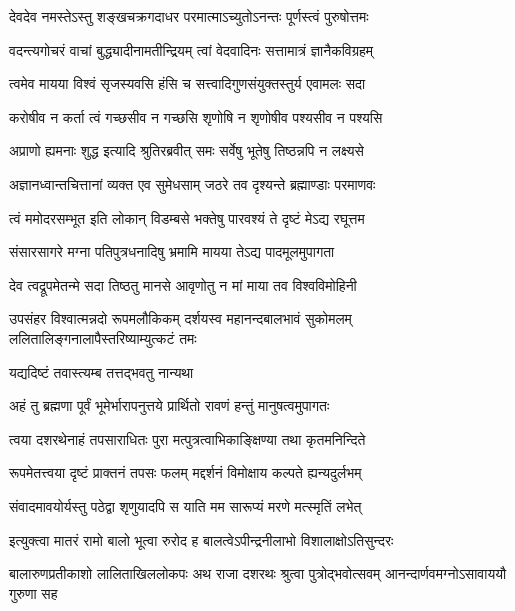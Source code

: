 
\twolineshloka
{देवदेव नमस्तेऽस्तु शङ्खचक्रगदाधर}
{परमात्माऽच्युतोऽनन्तः पूर्णस्त्वं पुरुषोत्तमः} %

\twolineshloka
{वदन्त्यगोचरं वाचां बुद्ध्यादीनामतीन्द्रियम्}
{त्वां वेदवादिनः सत्तामात्रं ज्ञानैकविग्रहम्} %

\twolineshloka
{त्वमेव मायया विश्वं सृजस्यवसि हंसि च}
{सत्त्वादिगुणसंयुक्तस्तुर्य एवामलः सदा} %

\twolineshloka
{करोषीव न कर्ता त्वं गच्छसीव न गच्छसि}
{शृणोषि न शृणोषीव पश्यसीव न पश्यसि} %

\twolineshloka
{अप्राणो ह्यमनाः शुद्ध इत्यादि श्रुतिरब्रवीत्}
{समः सर्वेषु भूतेषु तिष्ठन्नपि न लक्ष्यसे} %

\twolineshloka
{अज्ञानध्वान्तचित्तानां व्यक्त एव सुमेधसाम्}
{जठरे तव दृश्यन्ते ब्रह्माण्डाः परमाणवः} %

\twolineshloka
{त्वं ममोदरसम्भूत इति लोकान् विडम्बसे}
{भक्तेषु पारवश्यं ते दृष्टं मेऽद्य रघूत्तम} %

\twolineshloka
{संसारसागरे मग्ना पतिपुत्रधनादिषु}
{भ्रमामि मायया तेऽद्य पादमूलमुपागता} %

\twolineshloka
{देव त्वद्रूपमेतन्मे सदा तिष्ठतु मानसे}
{आवृणोतु न मां माया तव विश्वविमोहिनी} %

\threelineshloka
{उपसंहर विश्वात्मन्नदो रूपमलौकिकम्}
{दर्शयस्व महानन्दबालभावं सुकोमलम्}
{ललितालिङ्गनालापैस्तरिष्याम्युत्कटं तमः} %


\onelineshloka
{यद्यदिष्टं तवास्त्यम्ब तत्तद्भवतु नान्यथा} %

\twolineshloka
{अहं तु ब्रह्मणा पूर्वं भूमेर्भारापनुत्तये}
{प्रार्थितो रावणं हन्तुं मानुषत्वमुपागतः} %

\twolineshloka
{त्वया दशरथेनाहं तपसाराधितः पुरा}
{मत्पुत्रत्वाभिकाङ्क्षिण्या तथा कृतमनिन्दिते} %

\twolineshloka
{रूपमेतत्त्वया दृष्टं प्राक्तनं तपसः फलम्}
{मद्दर्शनं विमोक्षाय कल्पते ह्यन्यदुर्लभम्} %

\twolineshloka
{संवादमावयोर्यस्तु पठेद्वा शृणुयादपि}
{स याति मम सारूप्यं मरणे मत्स्मृतिं लभेत्} %

\twolineshloka
{इत्युक्त्वा मातरं रामो बालो भूत्वा रुरोद ह}
{बालत्वेऽपीन्द्रनीलाभो विशालाक्षोऽतिसुन्दरः} %

\threelineshloka
{बालारुणप्रतीकाशो लालिताखिललोकपः}
{अथ राजा दशरथः श्रुत्वा पुत्रोद्भवोत्सवम्}
{आनन्दार्णवमग्नोऽसावाययौ गुरुणा सह} %

